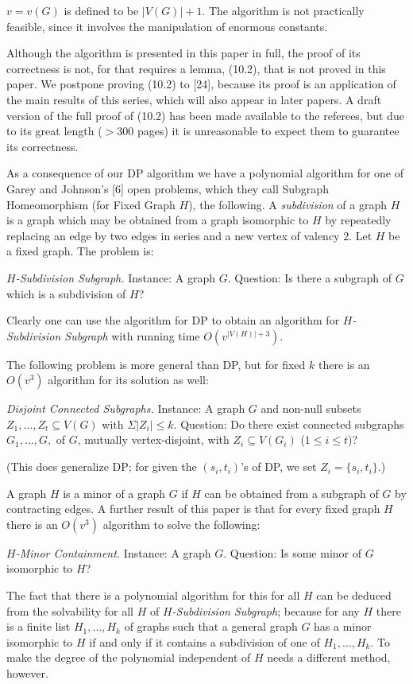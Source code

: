 \noindent $v = v(G)$ is defined to be $|V(G)| + 1$. The algorithm is not practically feasible, since it involves the manipulation of enormous constants.

Although the algorithm is presented in this paper in full, the proof of its correctness is not, for that requires a lemma, (10.2), that is not proved in this paper. We postpone proving (10.2) to [24], because its proof is an application of the main results of this series, which will also appear in later papers. A draft version of the full proof of (10.2) has been made available to the referees, but due to its great length ($> 300$ pages) it is unreasonable to expect them to guarantee its correctness.

As a consequence of our DP algorithm we have a polynomial algorithm for one of Garey and Johnson's [6] open problems, which they call Subgraph Homeomorphism (for Fixed Graph $H$), the following. A \textit{subdivision} of a graph $H$ is a graph which may be obtained from a graph isomorphic to $H$ by repeatedly replacing an edge by two edges in series and a new vertex of valency 2. Let $H$ be a fixed graph. The problem is:

\textit{$H$-Subdivision Subgraph.} Instance: A graph $G$. Question: Is there a subgraph of $G$ which is a subdivision of $H$?

Clearly one can use the algorithm for DP to obtain an algorithm for \textit{$H$-Subdivision Subgraph} with running time $O(v^{|V(H)| + 3})$.

The following problem is more general than DP, but for fixed $k$ there is an $O(v^3)$ algorithm for its solution as well:

\textit{Disjoint Connected Subgraphs.} Instance: A graph $G$ and non-null subsets $Z_1, \dots, Z_t \subseteq V(G)$ with $\Sigma |Z_i| \le k$. Question: Do there exist connected subgraphs $G_1, \dots, G,$ of $G$, mutually vertex-disjoint, with $Z_i \subseteq V(G_i)$ ($1 \le i \le t$)?

(This does generalize DP; for given the $(s_i, t_i)$'s of DP, we set $Z_i = \{s_i, t_i\}$.)

A graph $H$ is a minor of a graph $G$ if $H$ can be obtained from a subgraph of $G$ by contracting edges. A further result of this paper is that for every fixed graph $H$ there is an $O(v^3)$ algorithm to solve the following:

\textit{$H$-Minor Containment.} Instance: A graph $G$. Question: Is some minor of $G$ isomorphic to $H$?

The fact that there is a polynomial algorithm for this for all $H$ can be deduced from the solvability for all $H$ of \textit{$H$-Subdivision Subgraph}; because for any $H$ there is a finite list $H_1, \dots, H_k$ of graphs such that a general graph $G$ has a minor isomorphic to $H$ if and only if it contains a subdivision of one of $H_1, \dots, H_k$. To make the degree of the polynomial independent of $H$ needs a different method, however.
